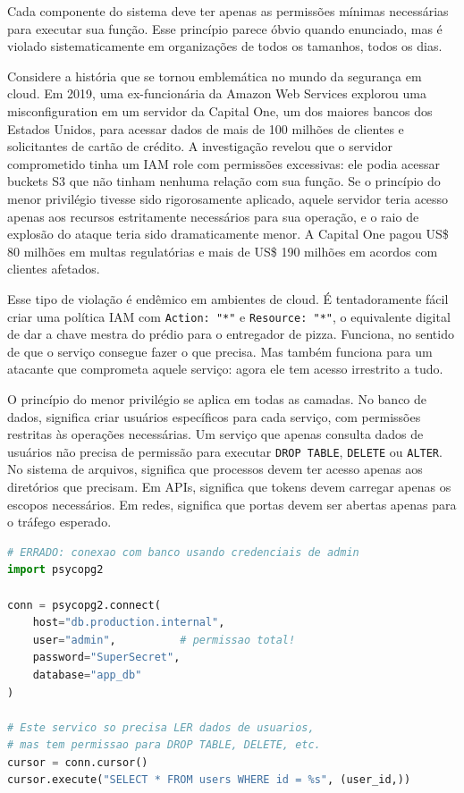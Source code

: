 Cada componente do sistema deve ter apenas as permissões mínimas necessárias para
executar sua função. Esse princípio parece óbvio quando enunciado, mas é violado
sistematicamente em organizações de todos os tamanhos, todos os dias.

Considere a história que se tornou emblemática no mundo da segurança em cloud. Em
2019, uma ex-funcionária da Amazon Web Services explorou uma misconfiguration em
um servidor da Capital One, um dos maiores bancos dos Estados Unidos, para
acessar dados de mais de 100 milhões de clientes e solicitantes de cartão de
crédito. A investigação revelou que o servidor comprometido tinha um IAM role com
permissões excessivas: ele podia acessar buckets S3 que não tinham nenhuma relação
com sua função. Se o princípio do menor privilégio tivesse sido rigorosamente
aplicado, aquele servidor teria acesso apenas aos recursos estritamente
necessários para sua operação, e o raio de explosão do ataque teria sido
dramaticamente menor. A Capital One pagou US\$ 80 milhões em multas regulatórias e
mais de US\$ 190 milhões em acordos com clientes afetados.

Esse tipo de violação é endêmico em ambientes de cloud. É tentadoramente fácil
criar uma política IAM com \texttt{Action: "*"} e \texttt{Resource: "*"}, o
equivalente digital de dar a chave mestra do prédio para o entregador de pizza.
Funciona, no sentido de que o serviço consegue fazer o que precisa. Mas também
funciona para um atacante que comprometa aquele serviço: agora ele tem acesso
irrestrito a tudo.

O princípio do menor privilégio se aplica em todas as camadas. No banco de dados,
significa criar usuários específicos para cada serviço, com permissões restritas
às operações necessárias. Um serviço que apenas consulta dados de usuários não
precisa de permissão para executar \texttt{DROP TABLE}, \texttt{DELETE} ou
\texttt{ALTER}. No sistema de arquivos, significa que processos devem ter acesso
apenas aos diretórios que precisam. Em APIs, significa que tokens devem carregar
apenas os escopos necessários. Em redes, significa que portas devem ser abertas
apenas para o tráfego esperado.

\begin{lstlisting}[language=Python, caption={Menor privilégio -- exemplo ruim}]
# ERRADO: conexao com banco usando credenciais de admin
import psycopg2

conn = psycopg2.connect(
    host="db.production.internal",
    user="admin",          # permissao total!
    password="SuperSecret",
    database="app_db"
)

# Este servico so precisa LER dados de usuarios,
# mas tem permissao para DROP TABLE, DELETE, etc.
cursor = conn.cursor()
cursor.execute("SELECT * FROM users WHERE id = %s", (user_id,))
\end{lstlisting}

